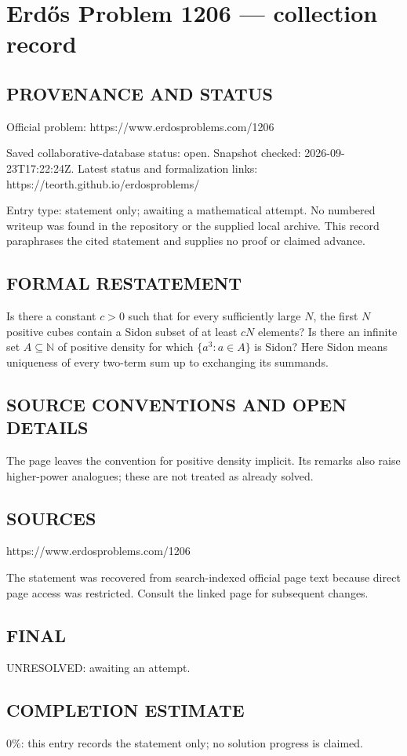 \section*{Erd\H{o}s Problem 1206 --- collection record}

\subsection*{PROVENANCE AND STATUS}
Official problem: https://www.erdosproblems.com/1206

Saved collaborative-database status: open.
Snapshot checked: 2026-09-23T17:22:24Z.
Latest status and formalization links: https://teorth.github.io/erdosproblems/

Entry type: statement only; awaiting a mathematical attempt. No numbered writeup was found in the repository or the supplied local archive. This record paraphrases the cited statement and supplies no proof or claimed advance.

\subsection*{FORMAL RESTATEMENT}
Is there a constant $c>0$ such that for every sufficiently large $N$, the first $N$ positive cubes contain a Sidon subset of at least $cN$ elements? Is there an infinite set $A\subseteq\mathbb N$ of positive density for which $\{a^3:a\in A\}$ is Sidon? Here Sidon means uniqueness of every two-term sum up to exchanging its summands.

\subsection*{SOURCE CONVENTIONS AND OPEN DETAILS}
The page leaves the convention for positive density implicit. Its remarks also raise higher-power analogues; these are not treated as already solved.

\subsection*{SOURCES}
https://www.erdosproblems.com/1206

The statement was recovered from search-indexed official page text because direct page access was restricted. Consult the linked page for subsequent changes.

\subsection*{FINAL}
UNRESOLVED: awaiting an attempt.

\subsection*{COMPLETION ESTIMATE}
$0\%$: this entry records the statement only; no solution progress is claimed.
